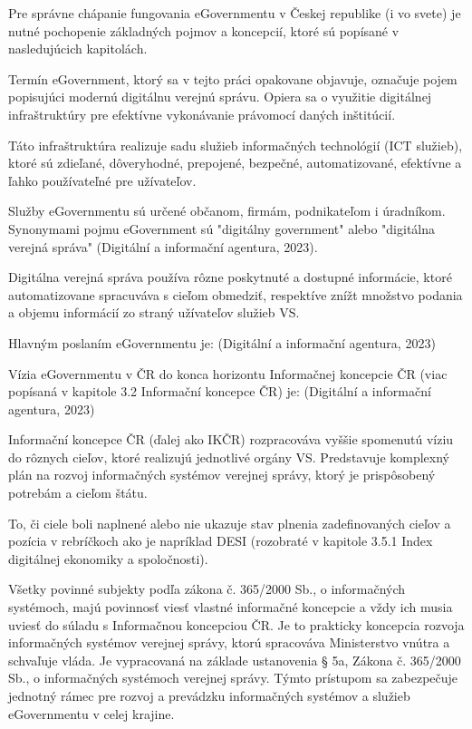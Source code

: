 Pre správne chápanie fungovania eGovernmentu v Českej republike (i vo svete) je nutné pochopenie základných pojmov a koncepcií, ktoré sú popísané v nasledujúcich kapitolách.

Termín eGovernment,  ktorý sa v tejto práci opakovane objavuje, označuje pojem popisujúci modernú digitálnu verejnú správu. Opiera sa o využitie digitálnej infraštruktúry pre efektívne vykonávanie právomocí daných inštitúcií. 

Táto infraštruktúra realizuje sadu služieb informačných technológií (ICT služieb), ktoré sú zdieľané, dôveryhodné, prepojené, bezpečné, automatizované, efektívne a ľahko používateľné pre užívateľov. 

Služby eGovernmentu sú určené občanom, firmám, podnikateľom i úradníkom. Synonymami pojmu eGovernment sú "digitálny government" alebo "digitálna verejná správa" \scr(Digitální a informační agentura, 2023).

Digitálna verejná správa používa rôzne poskytnuté a dostupné informácie, ktoré automatizovane spracuváva s cieľom obmedziť, respektíve znížt množstvo podania a objemu informácií zo straný užívateľov služieb VS.

Hlavným poslaním eGovernmentu je:  \scr(Digitální a informační agentura, 2023)

Vízia eGovernmentu v ČR do konca horizontu Informačnej koncepcie ČR (viac popísaná v kapitole 3.2 Informační koncepce ČR) je:  \scr(Digitální a informační agentura, 2023)

Informační koncepce ČR (ďalej ako IKČR) rozpracováva vyššie spomenutú víziu do rôznych cieľov, ktoré realizujú jednotlivé orgány VS. Predstavuje komplexný plán na rozvoj informačných systémov verejnej správy, ktorý je prispôsobený potrebám a cieľom štátu.

To, či ciele boli naplnené alebo nie ukazuje stav plnenia zadefinovaných cieľov a pozícia v rebríčkoch ako je napríklad DESI (rozobraté v kapitole 3.5.1 Index digitálnej ekonomiky a spoločnosti).

Všetky povinné subjekty podľa zákona  č. 365/2000 Sb., o informačných systémoch, majú povinnosť viesť vlastné informačné koncepcie a vždy ich musia uviesť do súladu s Informačnou koncepciou ČR. Je to prakticky koncepcia rozvoja informačných systémov verejnej správy, ktorú spracováva Ministerstvo vnútra a schvaľuje vláda. Je vypracovaná na základe ustanovenia § 5a, Zákona č. 365/2000 Sb., o informačných systémoch verejnej správy. Týmto prístupom sa zabezpečuje jednotný rámec pre rozvoj a prevádzku informačných systémov a služieb eGovernmentu v celej krajine.

